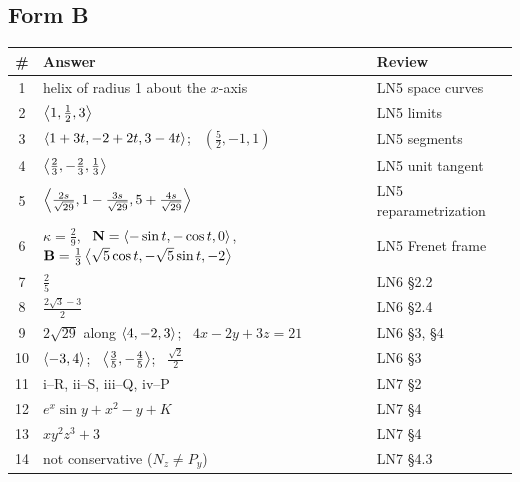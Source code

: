\subsection*{Form B}
\begin{center}
\renewcommand{\arraystretch}{1.35}
\begin{tabularx}{\linewidth}{c>{\raggedright\arraybackslash}Xl}
\toprule
\# & Answer & Review\\
\midrule
1 & helix of radius 1 about the $x$-axis & LN5 space curves\\
2 & $\left\langle 1,\frac12,3 \right\rangle$ & LN5 limits\\
3 & $\left\langle 1+3t,-2+2t,3-4t \right\rangle$; \ $\left(\frac52,-1,1\right)$ & LN5 segments\\
4 & $\left\langle \frac23,-\frac23,\frac13 \right\rangle$ & LN5 unit tangent\\
5 & $\left\langle \frac{2s}{\sqrt{29}},1-\frac{3s}{\sqrt{29}},5+\frac{4s}{\sqrt{29}} \right\rangle$ & LN5 reparametrization\\
6 & $\kappa=\frac29$, \ $\mathbf{N}=\left\langle -\sin t,-\cos t,0 \right\rangle$, \ $\mathbf{B}=\frac13\left\langle \sqrt5\cos t,-\sqrt5\sin t,-2 \right\rangle$ & LN5 Frenet frame\\
7 & $\frac25$ & LN6 \S2.2\\
8 & $\frac{2\sqrt3-3}{2}$ & LN6 \S2.4\\
9 & $2\sqrt{29}$ along $\left\langle 4,-2,3 \right\rangle$; \ $4x-2y+3z=21$ & LN6 \S3, \S4\\
10 & $\left\langle -3,4 \right\rangle$; \ $\left\langle \frac35,-\frac45 \right\rangle$; \ $\frac{\sqrt2}{2}$ & LN6 \S3\\
11 & i--R, ii--S, iii--Q, iv--P & LN7 \S2\\
12 & $e^x\sin y+x^2-y+K$ & LN7 \S4\\
13 & $xy^2z^3+3$ & LN7 \S4\\
14 & not conservative ($N_z\neq P_y$) & LN7 \S4.3\\
\bottomrule
\end{tabularx}
\end{center}
